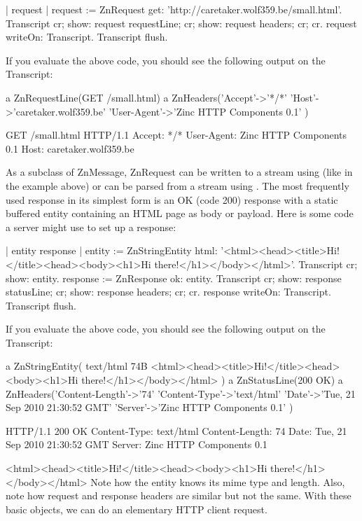 \documentclass[a4paper,10pt,twoside]{book}
\begin{document}
\begin{code}{}
| request |
request := ZnRequest get: 'http://caretaker.wolf359.be/small.html'.
Transcript 
  cr; show: request requestLine;
  cr; show: request headers;
  cr; cr.
request writeOn: Transcript.
Transcript flush.
\end{code}  

If you evaluate the above code, you should see the following output on the Transcript:
\begin{code}{}
a ZnRequestLine(GET /small.html)
a ZnHeaders('Accept'->'*/*' 'Host'->'caretaker.wolf359.be' 'User-Agent'->'Zinc HTTP Components 0.1' )

GET /small.html HTTP/1.1
Accept: */*
User-Agent: Zinc HTTP Components 0.1
Host: caretaker.wolf359.be
\end{code}
As a subclass of ZnMessage, ZnRequest can be written to a stream using  (like in the example above) or can be parsed from a stream using . The most frequently used response in its simplest form is an OK (code 200) response with a static buffered entity containing an HTML page as body or payload. Here is some code a server might use to set up a response:

\begin{code}{}
| entity response |
entity := ZnStringEntity html: '<html><head><title>Hi!</title><head><body><h1>Hi there!</h1></body></html>'.
Transcript
  cr; show: entity.
response := ZnResponse ok: entity.
Transcript 
  cr; show: response statusLine;
  cr; show: response headers;
  cr; cr.
response writeOn: Transcript.
Transcript flush.
\end{code}

If you evaluate the above code, you should see the following output on the Transcript:

a ZnStringEntity( text/html 74B <html><head><title>Hi!</title><head><body><h1>Hi there!</h1></body></html> )
a ZnStatusLine(200 OK)
a ZnHeaders('Content-Length'->'74' 'Content-Type'->'text/html' 'Date'->'Tue, 21 Sep 2010 21:30:52 GMT' 
'Server'->'Zinc HTTP Components 0.1' )

HTTP/1.1 200 OK
Content-Type: text/html
Content-Length: 74
Date: Tue, 21 Sep 2010 21:30:52 GMT
Server: Zinc HTTP Components 0.1

<html><head><title>Hi!</title><head><body><h1>Hi there!</h1></body></html>
Note how the entity knows its mime type and length. Also, note how request and response headers are similar but not the same. With these basic objects, we can do an elementary HTTP client request.
\end{document}

